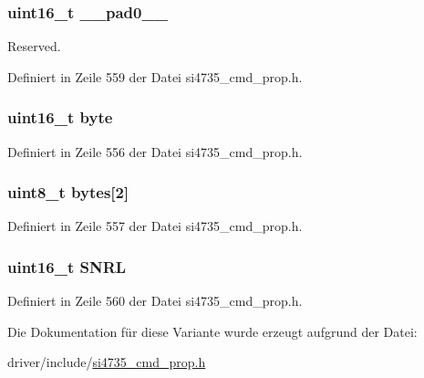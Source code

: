 \subsubsection[{\+\_\+\+\_\+pad0\+\_\+\+\_\+}]{\setlength{\rightskip}{0pt plus 5cm}uint16\+\_\+t \+\_\+\+\_\+pad0\+\_\+\+\_\+}\label{unionfm__rsq__snr__lo__thres_a77132c2c26a75f5b8751b235cda23828}


Reserved. 



Definiert in Zeile 559 der Datei si4735\+\_\+cmd\+\_\+prop.\+h.

\hypertarget{unionfm__rsq__snr__lo__thres_ab0549c1b5ea980a02e7eab77e21fea49}{}
\subsubsection[{byte}]{\setlength{\rightskip}{0pt plus 5cm}uint16\+\_\+t byte}\label{unionfm__rsq__snr__lo__thres_ab0549c1b5ea980a02e7eab77e21fea49}


Definiert in Zeile 556 der Datei si4735\+\_\+cmd\+\_\+prop.\+h.

\hypertarget{unionfm__rsq__snr__lo__thres_a46e4c05d20a047ec169f60d3167e912e}{}
\subsubsection[{bytes}]{\setlength{\rightskip}{0pt plus 5cm}uint8\+\_\+t bytes\mbox{[}2\mbox{]}}\label{unionfm__rsq__snr__lo__thres_a46e4c05d20a047ec169f60d3167e912e}


Definiert in Zeile 557 der Datei si4735\+\_\+cmd\+\_\+prop.\+h.

\hypertarget{unionfm__rsq__snr__lo__thres_a78a9e0c1e70e64406ad160b491c6a7de}{}
\subsubsection[{S\+N\+R\+L}]{\setlength{\rightskip}{0pt plus 5cm}uint16\+\_\+t S\+N\+R\+L}\label{unionfm__rsq__snr__lo__thres_a78a9e0c1e70e64406ad160b491c6a7de}


Definiert in Zeile 560 der Datei si4735\+\_\+cmd\+\_\+prop.\+h.



Die Dokumentation für diese Variante wurde erzeugt aufgrund der Datei\+:\begin{DoxyCompactItemize}
\item 
driver/include/\hyperlink{si4735__cmd__prop_8h}{si4735\+\_\+cmd\+\_\+prop.\+h}\end{DoxyCompactItemize}
